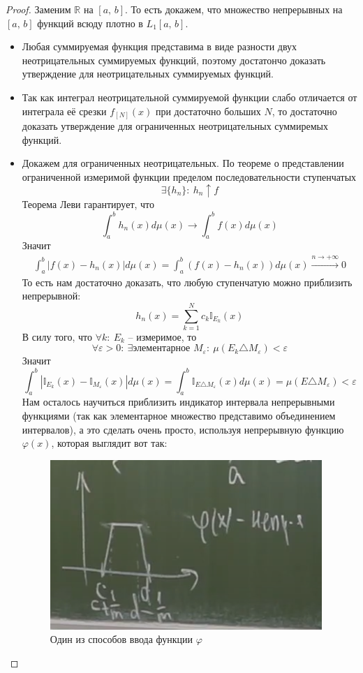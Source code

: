 \documentclass[a4paper,12pt]{article}
\renewcommand{\phi}{\ensuremath{\varphi}}
\theoremstyle{plain}
\theoremstyle{definition}
\theoremstyle{remark}
\begin{document}
\begin{proof}
	Заменим $\mathbb{R}$ на $[a,\,b]$. То есть докажем, что множество непрерывных на $[a,\,b]$ функций всюду плотно в $L_1[a,\,b]$.

	\begin{itemize}
		\item Любая суммируемая функция представима в виде разности двух неотрицательных суммируемых функций, поэтому достатончо доказать утверждение для
		      неотрицательных суммируемых функций.
		\item Так как интеграл неотрицательной суммируемой функции слабо отличается от интеграла её срезки $f_{[N]}(x)$ при достаточно больших $N$, то
		      достаточно доказать утверждение для ограниченных неотрицательных суммиремых функций.
		\item Докажем для ограниченных неотрицательных. По теореме о представлении ограниченной измеримой функции пределом последовательности ступенчатых
		      \[\exists \{h_n\}:\: h_n \uparrow f\]
		      Теорема Леви гарантирует, что
		      \[\int_a^b h_n(x)d\mu(x) \to \int_a^b f(x)d\mu(x)\]
		      Значит
		      \begin{align*}
			      \int_a^b |f(x) - h_n(x)|d\mu(x) = \int_a^b (f(x) - h_n(x))d\mu(x) \stackrel{n \to +\infty}{\to} 0
		      \end{align*}
		      То есть нам достаточно доказать, что любую ступенчатую можно приблизить непрерывной:
		      \[h_n(x) = \sum_{k = 1}^N c_k \mathbb{I}_{E_k}(x)\]
		      В силу того, что $\forall k:\: E_k$ -- измеримое, то
		      \[\forall \varepsilon > 0:\: \exists \text{элементарное } M_\varepsilon:\: \mu(E_k \triangle M_\varepsilon) < \varepsilon \]
		      Значит
		      \[\int_a^b |\mathbb{I}_{E_k}(x) - \mathbb{I}_{M_\varepsilon}(x)|d\mu(x) = \int_a^b \mathbb{I}_{E \triangle M_\varepsilon}(x)d\mu(x) = \mu(E \triangle M_\varepsilon) < \varepsilon\]
		      Нам осталось научиться приблизить индикатор интервала непрерывными функциями (так как элементарное множество представимо объединением интервалов), а это сделать очень просто, используя непрерывную функцию $\phi(x)$, которая выглядит вот так:
		      \begin{figure}[h]
			      \includegraphics[scale=0.5]{img/phi_graph.png}
			      \caption{Один из способов ввода функции $\phi$}
		      \end{figure}


\end{itemize}
\end{proof}
\end{document}
